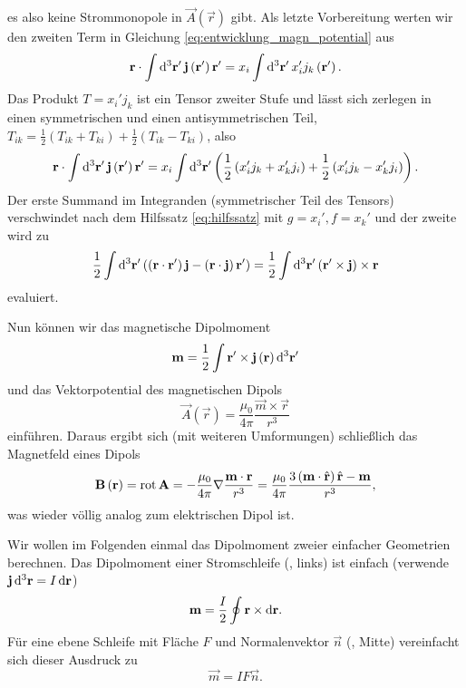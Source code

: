 es also keine Strommonopole in $\vec {A}\left(\vec {r}\right)$ gibt. Als letzte Vorbereitung werten wir den zweiten Term in Gleichung \eqref{eq:entwicklung_magn_potential} aus
\begin{equation*}
	\vec {r}\cdot \int \diffa[3]{\vec{r}'}\vec {j}\left(\vec {r}'\right)\vec {r}'=x_{i}\int \diffa[3]{\vec{r}'}x_{i}'j_{k}\left(\vec {r}'\right).
\end{equation*}
Das Produkt $T=x_{i}'j_{k}$ ist ein Tensor zweiter Stufe und lässt sich zerlegen in einen symmetrischen und einen antisymmetrischen Teil, $T_{ik}=\frac{1}{2}\left(T_{ik}+T_{ki}\right)+\frac{1}{2}\left(T_{ik}-T_{ki}\right)$, also
\begin{equation*}
	\vec {r}\cdot \int \diffa[3]{\vec{r}'}\vec {j}\left(\vec {r}'\right)\vec {r}'=x_{i}\int \diffa[3]{\vec{r}'}\left(\frac{1}{2}\left(x_{i}'j_{k}+x_{k}'j_{i}\right)+\frac{1}{2}\left(x_{i}'j_{k}-x_{k}'j_{i}\right)\right).
\end{equation*}
Der erste Summand im Integranden (symmetrischer Teil des Tensors) verschwindet nach dem Hilfssatz \eqref{eq:hilfssatz} mit $g=x_{i}',f=x_{k}'$ und der zweite wird zu
\begin{equation*}
	\frac{1}{2}\int \diffa[3]{\vec{r}'}\left(\left(\vec {r}\cdot \vec {r}'\right)\vec {j}-\left(\vec {r}\cdot \vec {j}\right)\vec {r}'\right)=\frac{1}{2}\int \diffa[3]{\vec{r}'}\left(\vec {r}'\times \vec {j}\right)\times \vec {r}
\end{equation*}
evaluiert.

Nun können wir das magnetische Dipolmoment
\begin{equation*}
	\vec {m}=\frac{1}{2}\int \vec {r}'\times \vec {j}\left(\vec {r}\right)\diffa[3]{\vec{r}'}
\end{equation*}
und das Vektorpotential des magnetischen Dipols
\begin{equation*}
	\vec {A}\left(\vec {r}\right)=\frac{\mu _{0}}{4\pi }\frac{\vec {m}\times \vec {r}}{r^{3}}
\end{equation*}
einführen. Daraus ergibt sich (mit weiteren Umformungen) schließlich das Magnetfeld eines Dipols
\begin{equation*}
	\vec {B}\left(\vec {r}\right)=\rot \vec {A}=-\frac{\mu _{0}}{4\pi }\nabla \frac{\vec {m}\cdot \vec {r}}{r^{3}}=\frac{\mu _{0}}{4\pi }\frac{3\left(\vec {m}\cdot \hat{\vec {r}}\right)\hat{\vec {r}}-\vec {m}}{r^{3}},
\end{equation*}
was wieder völlig analog zum elektrischen Dipol ist.

Wir wollen im Folgenden einmal das Dipolmoment zweier einfacher Geometrien berechnen. Das Dipolmoment einer Stromschleife (, links) ist einfach (verwende $\vec {j}\diffa[3]{\vec{r}}=I\diff \vec {r}$)
\begin{equation*}
	\vec {m}=\frac{I}{2}\oint \vec {r}\times \diff \vec {r}.
\end{equation*}
Für eine ebene Schleife mit Fläche $F$ und Normalenvektor $\vec {n}$ (, Mitte) vereinfacht sich dieser Ausdruck zu
\begin{equation*}
	\vec {m}=IF\vec {n}.
\end{equation*}


